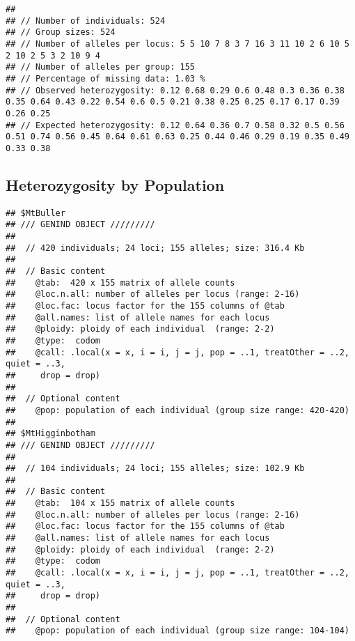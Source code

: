 \documentclass[
]{article}
\newenvironment{Shaded}{\begin{snugshade}}{\end{snugshade}}
\newcommand{\AttributeTok}[1]{\textcolor[rgb]{0.77,0.63,0.00}{#1}}
\newcommand{\FunctionTok}[1]{\textcolor[rgb]{0.00,0.00,0.00}{#1}}
\newcommand{\NormalTok}[1]{#1}
\newcommand{\OtherTok}[1]{\textcolor[rgb]{0.56,0.35,0.01}{#1}}
\newcommand{\SpecialCharTok}[1]{\textcolor[rgb]{0.00,0.00,0.00}{#1}}
\newcommand{\StringTok}[1]{\textcolor[rgb]{0.31,0.60,0.02}{#1}}
\begin{document}
\begin{verbatim}
## 
## // Number of individuals: 524
## // Group sizes: 524
## // Number of alleles per locus: 5 5 10 7 8 3 7 16 3 11 10 2 6 10 5 2 10 2 5 3 2 10 9 4
## // Number of alleles per group: 155
## // Percentage of missing data: 1.03 %
## // Observed heterozygosity: 0.12 0.68 0.29 0.6 0.48 0.3 0.36 0.38 0.35 0.64 0.43 0.22 0.54 0.6 0.5 0.21 0.38 0.25 0.25 0.17 0.17 0.39 0.26 0.25
## // Expected heterozygosity: 0.12 0.64 0.36 0.7 0.58 0.32 0.5 0.56 0.51 0.74 0.56 0.45 0.64 0.61 0.63 0.25 0.44 0.46 0.29 0.19 0.35 0.49 0.33 0.38
\end{verbatim}

\hypertarget{heterozygosity-by-population}{%
\subsection{Heterozygosity by
Population}\label{heterozygosity-by-population}}

\begin{Shaded}
\end{Shaded}

\begin{verbatim}
## $MtBuller
## /// GENIND OBJECT /////////
## 
##  // 420 individuals; 24 loci; 155 alleles; size: 316.4 Kb
## 
##  // Basic content
##    @tab:  420 x 155 matrix of allele counts
##    @loc.n.all: number of alleles per locus (range: 2-16)
##    @loc.fac: locus factor for the 155 columns of @tab
##    @all.names: list of allele names for each locus
##    @ploidy: ploidy of each individual  (range: 2-2)
##    @type:  codom
##    @call: .local(x = x, i = i, j = j, pop = ..1, treatOther = ..2, quiet = ..3, 
##     drop = drop)
## 
##  // Optional content
##    @pop: population of each individual (group size range: 420-420)
## 
## $MtHigginbotham
## /// GENIND OBJECT /////////
## 
##  // 104 individuals; 24 loci; 155 alleles; size: 102.9 Kb
## 
##  // Basic content
##    @tab:  104 x 155 matrix of allele counts
##    @loc.n.all: number of alleles per locus (range: 2-16)
##    @loc.fac: locus factor for the 155 columns of @tab
##    @all.names: list of allele names for each locus
##    @ploidy: ploidy of each individual  (range: 2-2)
##    @type:  codom
##    @call: .local(x = x, i = i, j = j, pop = ..1, treatOther = ..2, quiet = ..3, 
##     drop = drop)
## 
##  // Optional content
##    @pop: population of each individual (group size range: 104-104)
\end{verbatim}
\end{document}
